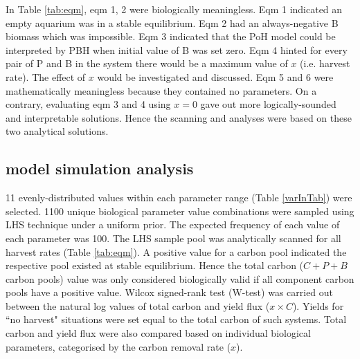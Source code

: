 \documentclass[../thesis.tex]{subfiles} %
\begin{document}
In Table \ref{tab:eqm}, eqm 1, 2 were biologically meaningless. Eqm 1 indicated an empty aquarium was in a stable equilibrium.  Eqm 2 had an always-negative B biomass which was impossible.  Eqm 3 indicated that the PoH model could be interpreted by PBH when initial value of B was set zero.  Eqm 4 hinted for every pair of P and B in the system there would be a maximum value of $x$ (i.e. harvest rate).  The effect of $x$ would be investigated and discussed.  Eqm 5 and 6 were mathematically meaningless because they contained no parameters.  On a contrary, evaluating eqm 3 and 4 using $x=0$ gave out more logically-sounded and interpretable solutions.  Hence the scanning and analyses were based on these two analytical solutions.

\subsection{model simulation analysis}
11 evenly-distributed values within each parameter range (Table \ref{varInTab}) were selected.  1100 unique biological parameter value combinations were sampled using LHS technique under a uniform prior.  The expected frequency of each value of each parameter was 100.  The LHS sample pool was analytically scanned for all harvest rates (Table \ref{tab:eqm}).  A positive value for a carbon pool indicated the respective pool existed at stable equilibrium.  Hence the total carbon ($C+P+B$ carbon pools) value was only considered biologically valid if all component carbon pools have a positive value.
Wilcox signed-rank test (W-test) was carried out between the natural log values of total carbon and yield flux ($x\times C$).  Yields for ``no harvest" situations were set equal to the total carbon of such systems.  Total carbon and yield flux were also compared based on individual biological parameters, categorised by the carbon removal rate ($x$).
\end{document}
